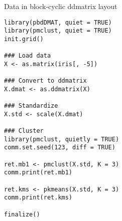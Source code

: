 \begin{frame}[fragile]
  \begin{exampleblock}{Data in block-cyclic ddmatrix layout}\pause
    \begin{lstlisting}[title=iris\_dmat.r]
library(pbdDMAT, quiet = TRUE)
library(pmclust, quiet = TRUE)
init.grid()

### Load data
X <- as.matrix(iris[, -5])

### Convert to ddmatrix
X.dmat <- as.ddmatrix(X)

### Standardize
X.std <- scale(X.dmat)

### Cluster
library(pmclust, quietly = TRUE)
comm.set.seed(123, diff = TRUE)

ret.mb1 <- pmclust(X.std, K = 3)
comm.print(ret.mb1)

ret.kms <- pkmeans(X.std, K = 3)
comm.print(ret.kms)

finalize()
    \end{lstlisting} %
  \end{exampleblock}
\end{frame}

